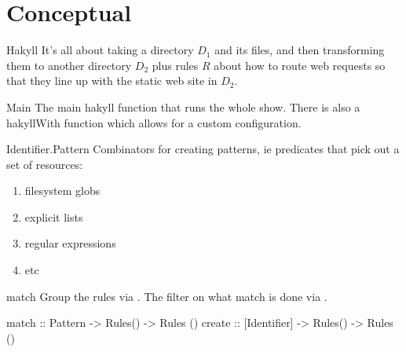 \documentclass[openany, 12pt]{book}
\begin{document}
\chapter{Conceptual}
\begin{intuition}{Hakyll}{}
  It's all about taking a directory $D_1$ and its files, and then
  transforming them to another directory $D_2$ plus rules $R$ about how to
  route web requests so that they line up with the static web site in $D_2$.
\end{intuition}

\begin{definition}{Main}{}
  The main hakyll function that runs the whole show. There is also a hakyllWith
  function which allows for a custom configuration.
\end{definition}

\begin{definition} {Identifier.Pattern}{}
  Combinators for creating patterns, ie predicates that pick out a set of
  resources:
  \begin{multicols}{2}
    \begin{enumerate}[label = {(\arabic*)}]
      \item filesystem globs
      \item explicit lists
      \item regular expressions
      \item etc
    \end{enumerate}
  \end{multicols}
\end{definition}

\begin{definition}{match}{}
  Group the rules via . The filter on what match is done via
  .
  \begin{haskell}{}
match  :: Pattern      -> Rules() -> Rules ()
create :: [Identifier] -> Rules() -> Rules ()
	\end{haskell}
\end{definition}
\end{document}
